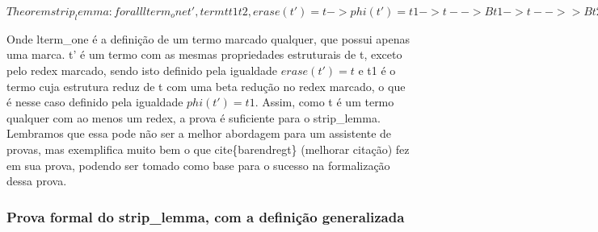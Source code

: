  $ Theorem strip_lemma: forall  lterm_one t', term t t1 t2, erase(t') = t -> phi(t') = t1 ->
t -->B t1 -> t -->>B t2 -> exists t3, t1 -->>B t3 /\ t2 -->>B t3. $ 

 Onde lterm\_one é a definição de um termo marcado qualquer, que possui apenas uma marca. t' é um termo com as mesmas propriedades
estruturais de t, exceto pelo redex marcado, sendo isto definido pela igualdade $ erase(t') = t $ e t1 é o termo cuja estrutura
reduz de t com uma beta redução no redex marcado, o que é nesse caso definido pela igualdade $ phi(t') = t1 $. Assim, como t é um
termo qualquer com ao menos um redex, a prova é suficiente para o strip\_lemma. Lembramos que essa pode não ser a melhor abordagem para
um assistente de provas, mas exemplifica muito bem o que cite\{barendregt\} (melhorar citação) fez em sua prova, podendo ser tomado como base para o sucesso
na formalização dessa prova. 

\subsubsection{Prova formal do strip\_lemma, com a definição generalizada}


